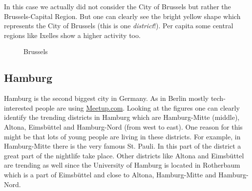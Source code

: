 In this case we actually did not consider the City of Brussels but rather the Brussels-Capital Region. But one can clearly see the bright yellow shape which represents the City of Brussels (this is one \emph{district}!). Per capita some central regions like Ixelles show a higher activity too. 
\begin{figure}[!htp]
	\hfill
	\caption{Brussels}\label{fig:madridmap}
\end{figure}

\subsection*{Hamburg}
Hamburg is the second biggest city in Germany. As in Berlin mostly tech-interested people are using \url{Meetup.com}. Looking at the figures one can clearly identify the trending districts in Hamburg which are Hamburg-Mitte (middle), Altona, Eimsbüttel and Hamburg-Nord (from west to east). One reason for this might be that lots of young people are living in these districts. For example, in Hamburg-Mitte there is the very famous St. Pauli. In this part of the district a great part of the nightlife take place. Other districts like Altona and Eimsbüttel are trending as well since the University of Hamburg is located in Rotherbaum which is a part of Eimsbüttel and close to Altona, Hamburg-Mitte and Hamburg-Nord.

